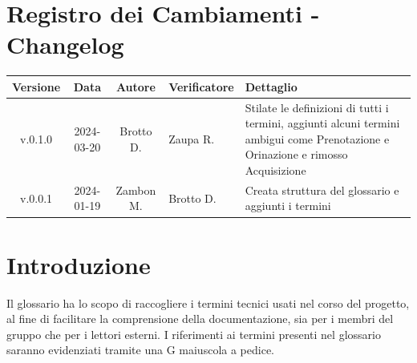\documentclass[12pt, oneside]{article}
\begin{document}
\section*{Registro dei Cambiamenti - Changelog}
\begin{tabular}{|c|c|c|p{3cm}|p{6cm}|}
  \hline
  \textbf{Versione} & \textbf{Data} & \textbf{Autore} & \textbf{Verificatore} & \textbf{Dettaglio}                                                                                                               \\
  \hline
  v.0.1.0           & 2024-03-20    & Brotto D.       & Zaupa R.              & Stilate le definizioni di tutti i termini, aggiunti alcuni termini ambigui come Prenotazione e Orinazione e rimosso Acquisizione \\
  \hline
  v.0.0.1           & 2024-01-19    & Zambon M.       & Brotto D.             & Creata struttura del glossario e aggiunti i termini                                                                              \\
  \hline
\end{tabular}
\newpage

\tableofcontents
\newpage
\section{Introduzione}
Il glossario ha lo scopo di raccogliere i termini tecnici usati nel corso del
progetto, al fine di facilitare la comprensione della documentazione, sia per i
membri del gruppo che per i lettori esterni. I riferimenti ai termini presenti
nel glossario saranno evidenziati tramite una G maiuscola a pedice.\\ 
\newpage
 
\newpage 
 
\newpage 

\newpage 
 
\newpage 
 
\newpage
 
\newpage 
 
\newpage 

\newpage 
 
\newpage  
\newpage
 
\newpage 
 
\newpage 

\newpage 
 
\newpage 
 
\newpage
 
\newpage 
 
\newpage 

\newpage 
 
\newpage 
 
\newpage
 
\newpage 
 
\newpage 

\newpage 
 
\newpage 
 
\newpage
 
\newpage
\end{document}
